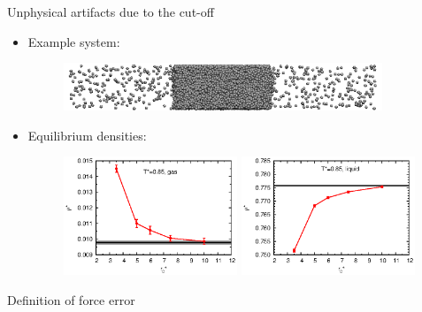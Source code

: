 \documentclass{beamer}
\newcommand{\redc}[1]{{\color{red} #1}}
\newcommand{\bluec}[1]{{\color{blue} #1}}
\renewcommand{\v}[1]{\textbf{\textit{#1}}}
\begin{document}
\begin{frame}{Unphysical artifacts due to the cut-off}
  \begin{itemize}\itemsep 10pt
  \item Example system:
    \begin{figure}
      \centering
      \includegraphics[width=0.9\textwidth]{figs/t0.85-n16000-rc07.5uni/confout-02.eps}
    \end{figure}
  \item Equilibrium densities:
    \begin{figure}
    \centering
    \includegraphics[width=0.49\textwidth]{figs/converge.new/t0p85-gas-1.eps} 
    \includegraphics[width=0.49\textwidth]{figs/converge.new/t0p85-liquid-1.eps} 
  \end{figure}  
  \end{itemize}
\end{frame}

\begin{frame}{Definition of force error}
\end{frame}
\end{document}
